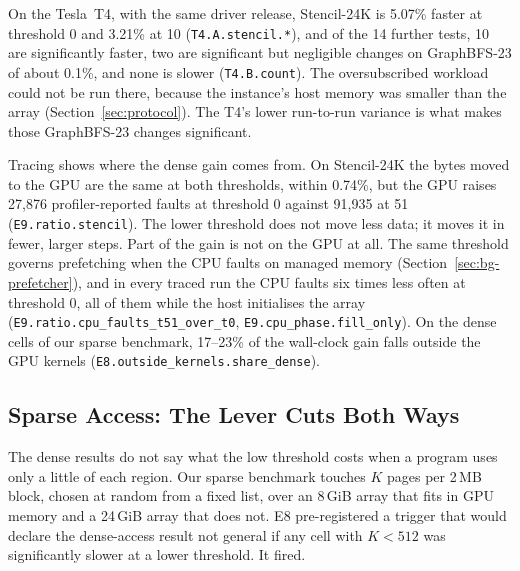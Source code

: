 On the Tesla~T4, with the same driver release, Stencil-24K is 5.07\% faster at
threshold 0 and 3.21\% at 10 (\texttt{T4.A.stencil.*}), and of the 14 further
tests, 10 are significantly faster, two are significant but negligible changes
on GraphBFS-23 of about 0.1\%, and none is slower (\texttt{T4.B.count}). The
oversubscribed workload could not be run there, because the instance's host
memory was smaller than the array (Section~\ref{sec:protocol}). The T4's lower
run-to-run variance is what makes those GraphBFS-23 changes significant.

\begin{table}[t]
\centering
\footnotesize
\caption{Stock driver, thresholds 0, 10 and 25 against the shipped 51, on the
RTX~5070~Ti (E7) and the Tesla~T4 (E7-T4), analysed separately. $\delta$: change
in median wall-clock; MDE at each family's level. $^{\ast}$Holm-significant.
$^{\dagger}$Holm-significant but smaller than the MDE. n/r: not run on the T4
(host memory). Full results with $p$-values are in the supplementary material.}
\label{tab:e7}

\end{table}

Tracing shows where the dense gain comes from. On Stencil-24K the bytes moved to
the GPU are the same at both thresholds, within 0.74\%, but the GPU raises
27{,}876 profiler-reported faults at threshold 0 against 91{,}935 at 51 (\texttt{E9.ratio.stencil}).
The lower threshold does not move less data; it moves it in fewer, larger
steps. Part of the gain is not on the GPU at all. The same threshold governs
prefetching when the CPU faults on managed memory (Section~\ref{sec:bg-prefetcher}),
and in every traced run the CPU faults six times less often at threshold 0, all
of them while the host initialises the array (\texttt{E9.ratio.cpu\_faults\_t51\_over\_t0},
\texttt{E9.cpu\_phase.fill\_only}). On the dense cells of our sparse benchmark,
17--23\% of the wall-clock gain falls outside the GPU kernels
(\texttt{E8.outside\_kernels.share\_dense}).

\subsection{Sparse Access: The Lever Cuts Both Ways}
\label{sec:thr-sparse}

The dense results do not say what the low threshold costs when a program uses
only a little of each region. Our sparse benchmark touches $K$ pages per
2\,MB block, chosen at random from a fixed list, over an 8\,GiB array that fits
in GPU memory and a 24\,GiB array that does not. E8 pre-registered a trigger
that would declare the dense-access result not general if any cell with
$K < 512$ was significantly slower at a lower threshold. It fired.

